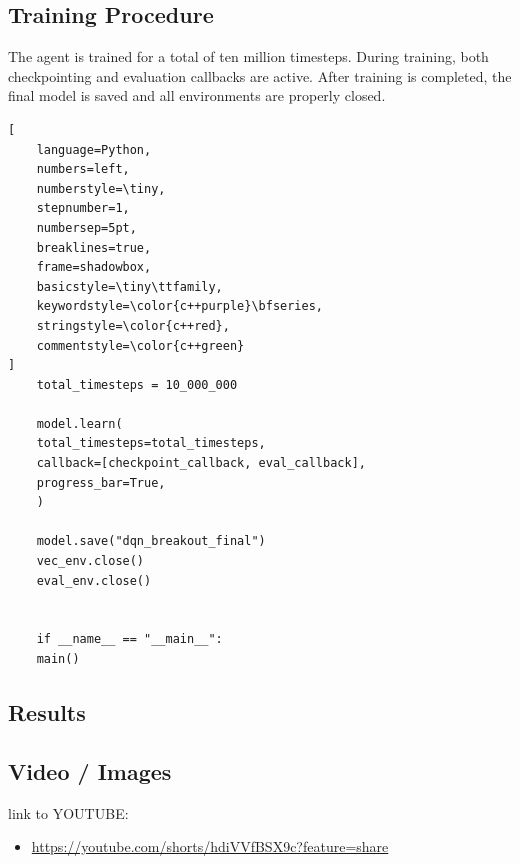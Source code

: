 \subsection{Training Procedure}
    
    The agent is trained for a total of ten million timesteps. During training, both checkpointing and evaluation callbacks are active. After training is completed, the final model is saved and all environments are properly closed.
    
  \begin{lstlisting}[
    language=Python,
    numbers=left,
    numberstyle=\tiny,
    stepnumber=1,
    numbersep=5pt,
    breaklines=true,
    frame=shadowbox,
    basicstyle=\tiny\ttfamily,
    keywordstyle=\color{c++purple}\bfseries,
    stringstyle=\color{c++red},
    commentstyle=\color{c++green}
]
    total_timesteps = 10_000_000
    
    model.learn(
    total_timesteps=total_timesteps,
    callback=[checkpoint_callback, eval_callback],
    progress_bar=True,
    )
    
    model.save("dqn_breakout_final")
    vec_env.close()
    eval_env.close()
    
    
    if __name__ == "__main__":
    main()
    \end{lstlisting}
    

\subsection{Results}

    
    
    
    

\subsection{Video / Images}

    link to YOUTUBE:
    \begin{itemize}
        \item \url{https://youtube.com/shorts/hdiVVfBSX9c?feature=share}
    \end{itemize}

